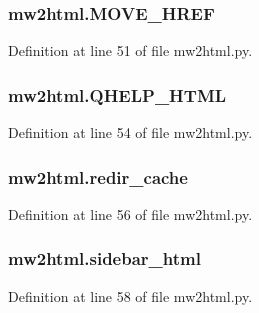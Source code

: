 \subsubsection[{\texorpdfstring{M\+O\+V\+E\+\_\+\+H\+R\+EF}{MOVE_HREF}}]{\setlength{\rightskip}{0pt plus 5cm}mw2html.\+M\+O\+V\+E\+\_\+\+H\+R\+EF}\hypertarget{namespacemw2html_a3e4055cf6a1070956dccf42a6ed72682}{}\label{namespacemw2html_a3e4055cf6a1070956dccf42a6ed72682}


Definition at line 51 of file mw2html.\+py.

\subsubsection[{\texorpdfstring{Q\+H\+E\+L\+P\+\_\+\+H\+T\+ML}{QHELP_HTML}}]{\setlength{\rightskip}{0pt plus 5cm}mw2html.\+Q\+H\+E\+L\+P\+\_\+\+H\+T\+ML}\hypertarget{namespacemw2html_a9751c2e63a93046633dc33af625ceb32}{}\label{namespacemw2html_a9751c2e63a93046633dc33af625ceb32}


Definition at line 54 of file mw2html.\+py.

\subsubsection[{\texorpdfstring{redir\+\_\+cache}{redir_cache}}]{\setlength{\rightskip}{0pt plus 5cm}mw2html.\+redir\+\_\+cache}\hypertarget{namespacemw2html_ac19c25d8c5f0e9ce859a9358615724eb}{}\label{namespacemw2html_ac19c25d8c5f0e9ce859a9358615724eb}


Definition at line 56 of file mw2html.\+py.

\subsubsection[{\texorpdfstring{sidebar\+\_\+html}{sidebar_html}}]{\setlength{\rightskip}{0pt plus 5cm}mw2html.\+sidebar\+\_\+html}\hypertarget{namespacemw2html_ab1100d5e32fc3ee7258fe49d72805377}{}\label{namespacemw2html_ab1100d5e32fc3ee7258fe49d72805377}


Definition at line 58 of file mw2html.\+py.


